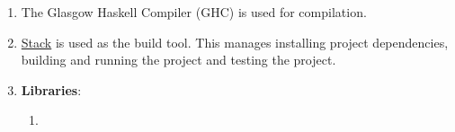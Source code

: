 \documentclass[12pt]{scrreprt}
\begin{document}
\begin{enumerate}
    \item The Glasgow Haskell Compiler (GHC) is used for compilation.
    \item \href{https://docs.haskellstack.org/en/stable/}{Stack} is used as the build tool. This manages installing project dependencies, building and running the project and testing the project.
    
    \item \textbf{Libraries}:
    \begin{enumerate}
        \item 

\end{enumerate}
\end{enumerate}
\end{document}
